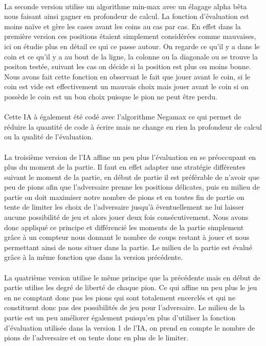 \documentclass[a4paper,10pt]{article}
\begin{document}
\paragraph{}La seconde version utilise un algorithme min-max avec un élagage alpha b\^eta  nous faisant ainsi gagner en profondeur de calcul. La fonction d'évaluation est moins naïve et gère les cases avant les coins au cas par cas. En effet dans la première version ces positions étaient simplement considérées comme mauvaises, ici on étudie plus en détail ce qui ce passe autour. On regarde ce qu'il y a dans le coin et ce qu'il y a au bout de la ligne, la colonne ou la diagonale ou se trouve la positon testée, suivant les cas on décide si la position est plus ou moins bonne.
Nous avons fait cette fonction en observant le fait que jouer avant le coin, si le coin est vide est effectivement un mauvais choix mais jouer avant le coin si on possède le coin est un bon choix puisque le pion ne peut \^etre perdu.

\paragraph{}Cette IA à également été codé avec l'algorithme Negamax ce qui permet de réduire la quantité de code à écrire mais ne change en rien la profondeur de calcul ou la qualité de l'évaluation.

\paragraph{} La troisième version de l'IA affine un peu plus l'évaluation en se préoccupant en plus du moment de la partie. Il faut en effet adapter une stratégie différentes suivant le moment de la partie, en début de partie il est préférable de n'avoir que peu de pions afin que l'adversaire prenne les positions délicates, puis en milieu de partie on doit maximiser notre nombre de pions et en toutes fin de partie on tente de limiter les choix de l'adversaire jusqu'à éventuellement ne lui laisser aucune possibilité de jeu et alors jouer deux fois consécutivement.
Nous avons donc appliqué ce principe et différencié les moments de la partie simplement grâce à un compteur nous donnant le nombre de coups restant à jouer et nous permettant ainsi de nous situer dans la partie.
Le milieu de la partie est évalué grâce à la même fonction que dans la version précédente.

\paragraph{} La quatrième version utilise le même principe que la précédente mais en début de partie utilise les degré de liberté de chaque pion. Ce qui affine un peu plus le jeu en ne comptant donc pas les pions qui sont totalement encerclés et qui ne constituent donc pas des possibilités de jeu pour l'adversaire.
Le milieu de la partie est un peu améliorer également puisqu'en plus d'utiliser la fonction d'évaluation utilisée dans la version 1 de l'IA, on prend en compte le nombre de pions de l'adversaire et on tente donc en plus de le limiter.
\end{document}
